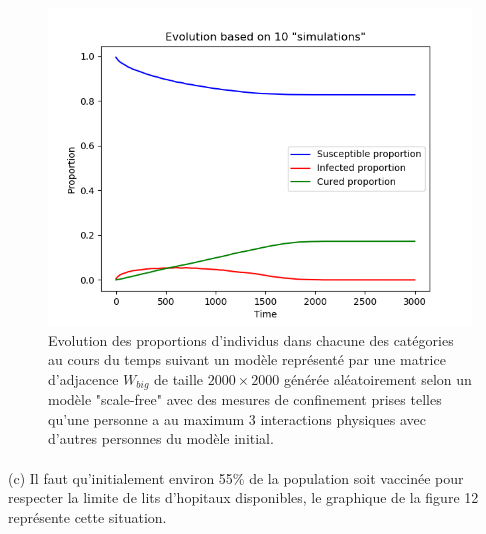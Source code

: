 \documentclass[a4paper, 12pt, oneside]{article}
\begin{document}
\begin{figure}[H]
	\centering
	\includegraphics[scale=1]{Wbig_dense_containment_comparaison.png} 
	\caption{Evolution des proportions d'individus dans chacune des catégories au cours du temps suivant un modèle représenté par une matrice d'adjacence $W_{big}$ de taille $2000 \times 2000$ générée aléatoirement selon un modèle "scale-free" avec des mesures de confinement prises telles qu'une personne a au maximum 3 interactions physiques avec d'autres personnes du modèle initial.}
\end{figure}

\paragraph{}(c) Il faut qu'initialement environ 55\% de la population soit vaccinée pour respecter la limite de lits d'hopitaux disponibles, le graphique de la figure 12 représente cette situation.
\end{document}
